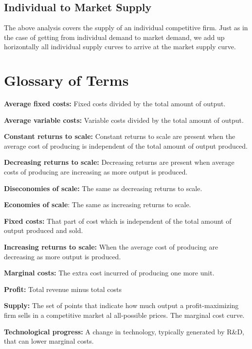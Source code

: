 \documentclass[
]{book}
\begin{document}
\hypertarget{individual-to-market-supply}{%
\subsection{Individual to Market Supply}\label{individual-to-market-supply}}

The above analysis covers the supply of an individual competitive firm. Just as in the case of getting from individual demand to market demand, we add up horizontally all individual supply curves to arrive at the market supply curve.

\hypertarget{glossary-of-terms-5}{%
\section{Glossary of Terms}\label{glossary-of-terms-5}}

\textbf{Average fixed costs:} Fixed costs divided by the total amount of output.

\textbf{Average variable costs:} Variable costs divided by the total amount of output.

\textbf{Constant returns to scale:} Constant returns to scale are present when the average cost of producing is independent of the total amount of output produced.

\textbf{Decreasing returns to scale:} Decreasing returns are present when average costs of producing are increasing as more output is produced.

\textbf{Diseconomies of scale:} The same as decreasing returns to scale.

\textbf{Economies of scale}: The same as increasing returns to scale.

\textbf{Fixed costs:} That part of cost which is independent of the total amount of output produced and sold.

\textbf{Increasing returns to scale:} When the average cost of producing are decreasing as more output is produced.

\textbf{Marginal costs:} The extra cost incurred of producing one more unit.

\textbf{Profit:} Total revenue minus total costs

\textbf{Supply:} The set of points that indicate how much output a profit-maximizing firm sells in a competitive market al all-possible prices. The marginal cost curve.

\textbf{Technological progress:} A change in technology, typically generated by R\&D, that can lower marginal costs.
\end{document}
